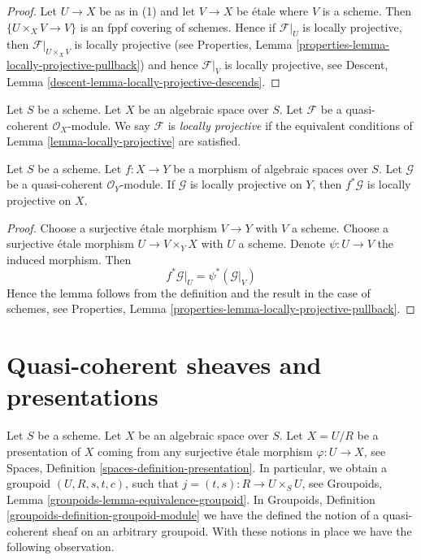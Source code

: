 \begin{proof}
Let $U \to X$ be as in (1) and let $V \to X$ be \'etale where
$V$ is a scheme. Then $\{U \times_X V \to V\}$ is an fppf covering
of schemes. Hence if $\mathcal{F}|_U$ is locally projective, then
$\mathcal{F}|_{U \times_X V}$ is locally projective (see
Properties, Lemma \ref{properties-lemma-locally-projective-pullback})
and hence $\mathcal{F}|_V$ is locally projective, see
Descent, Lemma \ref{descent-lemma-locally-projective-descends}.
\end{proof}

\begin{definition}
\label{definition-locally-projective}
Let $S$ be a scheme. Let $X$ be an algebraic space over $S$.
Let $\mathcal{F}$ be a quasi-coherent $\mathcal{O}_X$-module.
We say $\mathcal{F}$ is {\it locally projective}
if the equivalent conditions of
Lemma \ref{lemma-locally-projective}
are satisfied.
\end{definition}

\begin{lemma}
\label{lemma-locally-projective-pullback}
Let $S$ be a scheme.
Let $f : X \to Y$ be a morphism of algebraic spaces over $S$.
Let $\mathcal{G}$ be a quasi-coherent $\mathcal{O}_Y$-module.
If $\mathcal{G}$ is locally projective on $Y$, then $f^*\mathcal{G}$
is locally projective on $X$.
\end{lemma}

\begin{proof}
Choose a surjective \'etale morphism $V \to Y$ with $V$ a scheme.
Choose a surjective \'etale morphism $U \to V \times_Y X$ with
$U$ a scheme. Denote $\psi : U \to V$ the induced morphism.
Then
$$
f^*\mathcal{G}|_U = \psi^*(\mathcal{G}|_V)
$$
Hence the lemma follows from the definition and the result in the
case of schemes, see
Properties, Lemma \ref{properties-lemma-locally-projective-pullback}.
\end{proof}





\section{Quasi-coherent sheaves and presentations}
\label{section-quasi-coherent-presentation}

\noindent
Let $S$ be a scheme. Let $X$ be an algebraic space over $S$.
Let $X = U/R$ be a presentation of $X$ coming from any surjective
\'etale morphism $\varphi : U \to X$, see
Spaces, Definition \ref{spaces-definition-presentation}.
In particular, we obtain a groupoid $(U, R, s, t, c)$, such that
$j = (t, s) : R \to U \times_S U$, see
Groupoids, Lemma \ref{groupoids-lemma-equivalence-groupoid}.
In
Groupoids, Definition \ref{groupoids-definition-groupoid-module}
we have the defined the notion of a quasi-coherent sheaf
on an arbitrary groupoid. With these notions in place we have
the following observation.

